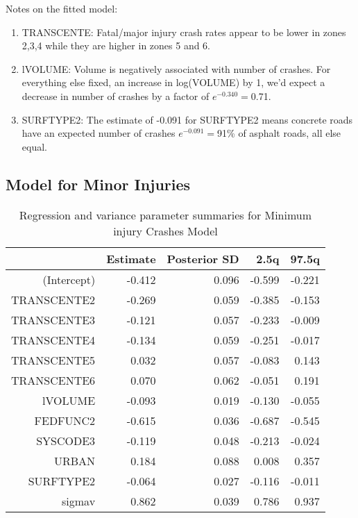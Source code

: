 \documentclass[a4paper]{article}\usepackage[]{graphicx}\usepackage[]{color}
\begin{document}
Notes on the fitted model:

\begin{enumerate}
\item
TRANSCENTE: Fatal/major injury crash rates appear to be lower in zones 2,3,4 while they are higher in zones 5 and 6. 

\item
lVOLUME: Volume is negatively associated with number of crashes. For everything else fixed, an increase in log(VOLUME) by 1, we'd expect a decrease in number of crashes by a factor of $e^{-0.340}=$0.71.

\item
SURFTYPE2: The estimate of -0.091 for SURFTYPE2 means concrete roads have an expected number of crashes $e^{-0.091}=$91\% of asphalt roads, all else equal.

\end{enumerate}


\clearpage
\subsection{Model for Minor Injuries}

\begin{table}[h]
\centering
\begin{tabular}{rrrrr}
  \hline
 & Estimate & Posterior SD & 2.5q & 97.5q \\ 
  \hline
(Intercept) & -0.412 & 0.096 & -0.599 & -0.221 \\ 
  TRANSCENTE2 & -0.269 & 0.059 & -0.385 & -0.153 \\ 
  TRANSCENTE3 & -0.121 & 0.057 & -0.233 & -0.009 \\ 
  TRANSCENTE4 & -0.134 & 0.059 & -0.251 & -0.017 \\ 
  TRANSCENTE5 & 0.032 & 0.057 & -0.083 & 0.143 \\ 
  TRANSCENTE6 & 0.070 & 0.062 & -0.051 & 0.191 \\ 
  lVOLUME & -0.093 & 0.019 & -0.130 & -0.055 \\ 
  FEDFUNC2 & -0.615 & 0.036 & -0.687 & -0.545 \\ 
  SYSCODE3 & -0.119 & 0.048 & -0.213 & -0.024 \\ 
  URBAN & 0.184 & 0.088 & 0.008 & 0.357 \\ 
  SURFTYPE2 & -0.064 & 0.027 & -0.116 & -0.011 \\ 
  sigmav & 0.862 & 0.039 & 0.786 & 0.937 \\ 
   \hline
\end{tabular}
\caption{Regression and variance parameter summaries for Minimum injury Crashes Model} 
\label{mincrash}
\end{table}
\end{document}
